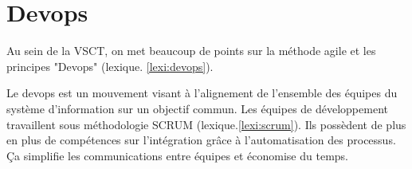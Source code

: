 \section{Devops}

Au sein de la VSCT, on met beaucoup de points sur la méthode agile et les principes "Devops" (lexique. \ref{lexi:devops}).

Le devops est un mouvement visant à l'alignement de l'ensemble des équipes du système d'information sur un objectif commun.
Les équipes de développement travaillent sous méthodologie SCRUM (lexique.\ref{lexi:scrum}).
Ils possèdent de plus en plus de compétences sur l'intégration grâce à l'automatisation des processus.
Ça simplifie les communications entre équipes et économise du temps.

